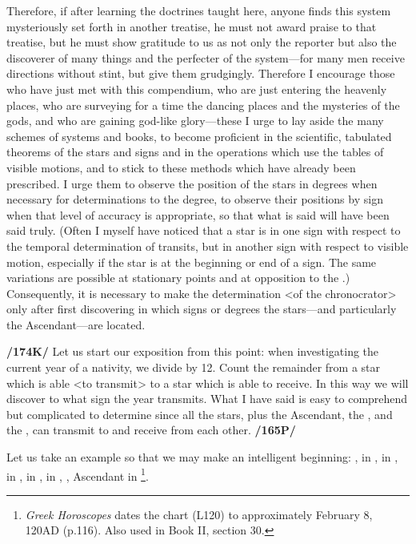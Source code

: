 Therefore, if after learning the doctrines taught here, anyone finds this system mysteriously set forth in another treatise, he must not award praise to that treatise, but he must show gratitude to us as not only the reporter but also the discoverer of many things and the perfecter of the system—for many men receive directions without stint, but give them grudgingly. Therefore I encourage those who have just met with this compendium, who are just entering the heavenly places, who are surveying for a time the dancing places and the mysteries of the gods, and who are gaining god-like glory—these I urge to lay aside the many schemes of systems and books, to become proficient in the scientific, tabulated theorems of the stars and signs and in the operations which use the tables of visible motions, and to stick to these methods which have already been prescribed. I urge them to
observe the position of the stars in degrees when necessary for determinations to the degree, to observe their positions by sign when that level of accuracy is appropriate, so that what is said will have been said truly. (Often I myself have noticed that a star is in one sign with respect to the temporal determination of transits, but in another sign with respect to visible motion, especially if the star is at the beginning or end of a sign. The same variations are possible at stationary points and at opposition to the \Sun.) Consequently, it is necessary to make the determination <of the chronocrator> only after first discovering in which signs or degrees the stars—and particularly the Ascendant—are located.

\textbf{/174K/} Let us start our exposition from this point: when investigating the current year of a nativity, we divide by 12. Count the remainder from a star which is able <to transmit> to a star which is able to receive. In this way we will discover to what sign the year transmits. What I have said is easy to comprehend but complicated to determine since all the stars, plus the Ascendant, the \Sun, and the \Moon,
can transmit to and receive from each other. \textbf{/165P/} 

Let us take an example so that we may make an intelligent beginning: \Sun, \Mercury\xspace in \Aquarius, \Moon\xspace in \Scorpio, \Saturn\xspace in \Cancer, \Jupiter\xspace in \Libra, \Venus in \Capricorn, \Mars, Ascendant in \Virgo
\footnote{\textit{Greek Horoscopes} dates the chart (L120) to approximately February 8, 120AD (p.116). Also used in Book II, section 30.}.

